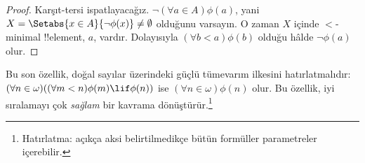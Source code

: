 \begin{proof}
Karşıt-tersi ispatlayacağız. $\lnot(\forall a\in A)\phi(a)$, yani
$X=\Setabs{x\in A}{\lnot\phi(x)}\neq\emptyset$ olduğunu varsayın. O zaman
$X$ içinde $<$-minimal !!{element}, $a$, vardır. Dolayısıyla
$(\forall b<a)\phi(b)$ olduğu hâlde $\lnot\phi(a)$ olur.
\end{proof}\noindent
Bu son özellik, doğal sayılar üzerindeki güçlü tümevarım ilkesini
hatırlatmalıdır: $(\forall n\in\omega)((\forall m<n)\phi(m)\lif\phi(n))$
ise $(\forall n\in\omega)\phi(n)$ olur. Bu özellik, iyi sıralamayı çok
\emph{sağlam} bir kavrama dönüştürür.\footnote{Hatırlatma: açıkça aksi
belirtilmedikçe bütün formüller parametreler içerebilir.}

